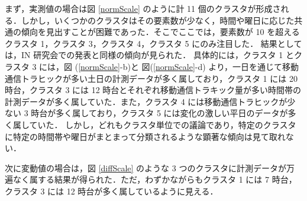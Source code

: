 \documentclass[a4j]{jarticle}
\begin{document}
まず，実測値の場合は図 \ref{normScale} のように計 11 個のクラスタが形成される．しかし，いくつかのクラスタはその要素数が少なく，時間や曜日に応じた共通の傾向を見出すことが困難であった．そこでここでは，要素数が 10 を超えるクラスタ 1，クラスタ 3，クラスタ 4，クラスタ 5 にのみ注目した．
結果としては，IN 研究会での発表と同様の傾向が見られた．
具体的には，クラスタ 1 とクラスタ 3 には，図 (\ref{normScale}-b)と 図(\ref{normScale}-d) より，一日を通じて移動通信トラヒックが多い土日の計測データが多く属しており，クラスタ 1 には 20 時台，クラスタ 3 には 12 時台とそれぞれ移動通信トラキック量が多い時間帯の計測データが多く属していた．また，クラスタ 4 には移動通信トラヒックが少ない 3 時台が多く属しており，クラスタ 5 には変化の激しい平日のデータが多く属していた．
しかし，どれもクラスタ単位での議論であり，特定のクラスタに特定の時間帯や曜日がまとまって分類されるような顕著な傾向は見て取れない．

次に変動値の場合は，図 \ref{diffScale} のような 3 つのクラスタに計測データが万遍なく属する結果が得られた．ただ，わずかながらもクラスタ 1 には 7 時台，クラスタ 3 には 12 時台が多く属しているように見える．
\end{document}
